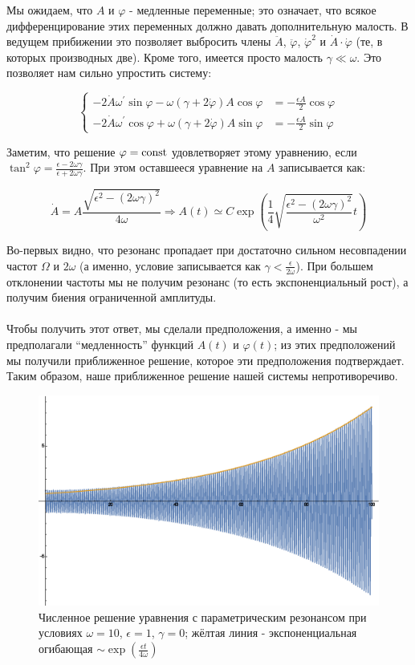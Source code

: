 \documentclass[a4paper,12pt]{article}
\begin{document}
 \noindent
Мы ожидаем, что $A$ и $\varphi$ - медленные переменные; это означает,
что всякое дифференцирование этих переменных должно давать дополнительную
малость. В ведущем прибижении это позволяет выбросить члены $\ddot{A}$,
$\ddot{\varphi}$, $\dot{\varphi}^{2}$ и $\dot{A}\cdot\dot{\varphi}$
(те, в которых производных две). Кроме того, имеется просто малость
$\gamma\ll\omega$. Это позволяет нам сильно упростить систему:

\[
\begin{cases}
-2\dot{A}\omega^{\prime}\sin\varphi-\omega(\gamma+2\dot{\varphi})A\cos\varphi & =-\frac{\epsilon A}{2}\cos\varphi\\
-2\dot{A}\omega^{\prime}\cos\varphi+\omega(\gamma+2\dot{\varphi})A\sin\varphi & =-\frac{\epsilon A}{2}\sin\varphi
\end{cases}
\]

 \noindent
Заметим, что решение $\varphi={\rm const}$ удовлетворяет этому уравнению,
если $\tan^{2}\varphi=\frac{\epsilon-2\omega\gamma}{\epsilon+2\omega\gamma}$.
При этом оставшееся уравнение на $A$ записывается как:

\[
\dot{A}=A\frac{\sqrt{\epsilon^{2}-(2\omega\gamma)^{2}}}{4\omega}\Rightarrow A(t)\simeq C\exp\left(\frac{1}{4}\sqrt{\frac{\epsilon^{2}-(2\omega\gamma)^{2}}{\omega^{2}}}t\right)
\]

 \noindent
Во-первых видно, что резонанс пропадает при достаточно сильном несовпадении
частот $\Omega$ и $2\omega$ (а именно, условие записывается как
$\gamma<\frac{\epsilon}{2\omega}$). При большем отклонении частоты
мы не получим резонанс (то есть экспоненциальный рост), а получим
биения ограниченной амплитуды. \\\\
Чтобы получить этот ответ, мы сделали предположения, а именно - мы
предполагали ``медленность'' функций $A(t)$ и $\varphi(t)$; из
этих предположений мы получили приближенное решение, которое эти предположения
подтверждает. Таким образом, наше приближенное решение нашей системы
непротиворечиво.

\begin{figure}[h]
\caption{Численное решение уравнения с параметрическим резонансом при условиях
$\omega=10$, $\epsilon=1$, $\gamma=0$; жёлтая линия - экспоненциальная
огибающая $\sim\exp\left(\frac{\epsilon t}{4\omega}\right)$}
\centering
\includegraphics[width=0.5\columnwidth]{paramresonance.eps}
\end{figure}
\end{document}
